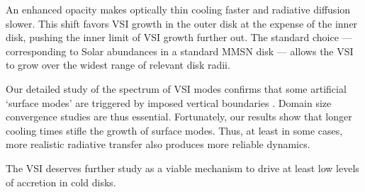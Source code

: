  An enhanced opacity makes optically thin cooling faster and radiative diffusion slower.  This shift favors VSI growth 
 in the outer disk at the expense of the inner disk, pushing the inner limit of VSI growth further out.
 The standard choice --- corresponding to Solar abundances in a standard MMSN disk --- allows the VSI 
 to grow over the widest range of relevant disk radii.
 
 Our detailed study of the spectrum of VSI modes confirms that some artificial `surface modes' are 
 triggered by imposed vertical boundaries .  Domain size
 convergence studies are thus essential.  Fortunately, our results show that longer cooling times 
  stifle the growth of surface modes.  Thus, at least in some cases, more realistic radiative transfer also produces more reliable dynamics.
 
 The VSI deserves further study as a viable mechanism to drive at least low levels of accretion in cold disks.
 



